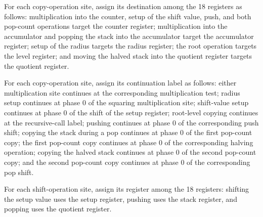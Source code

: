 \begin{definition}
\label{Complexity.LogProg.SavitchARM.cpDst}
\leanok
{}
For each copy-operation site, assign its destination among the 18 registers as follows:
multiplication into the counter, setup of the shift value, push, and both pop-count
operations target the counter register; multiplication into the accumulator and popping
the stack into the accumulator target the accumulator register; setup of the radius
targets the radius register; the root operation targets the level register; and moving
the halved stack into the quotient register targets the quotient register.
\end{definition}

\begin{definition}
\label{Complexity.LogProg.SavitchARM.cpExit}
\leanok
{}
For each copy-operation site, assign its continuation label as follows: either
multiplication site continues at the corresponding multiplication test; radius setup
continues at phase $0$ of the squaring multiplication site; shift-value setup continues
at phase $0$ of the shift of the setup register; root-level copying continues at the
recursive-call label; pushing continues at phase $0$ of the corresponding push shift;
copying the stack during a pop continues at phase $0$ of the first pop-count copy; the
first pop-count copy continues at phase $0$ of the corresponding halving operation;
copying the halved stack continues at phase $0$ of the second pop-count copy; and the
second pop-count copy continues at phase $0$ of the corresponding pop shift.
\end{definition}

\begin{definition}
\label{Complexity.LogProg.SavitchARM.shReg}
\leanok
{}
For each shift-operation site, assign its register among the 18 registers: shifting the
setup value uses the setup register, pushing uses the stack register, and popping uses
the quotient register.
\end{definition}

